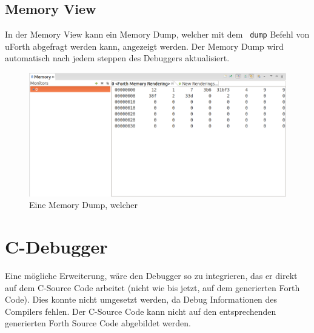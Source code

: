 \subsection{Memory View}

In der Memory View kann ein Memory Dump, welcher mit dem \verb! dump! Befehl von uForth abgefragt werden kann, angezeigt werden. Der Memory Dump wird automatisch nach jedem steppen des Debuggers aktualisiert.

\begin{figure}[H]
	\centering
		\includegraphics[scale=0.35]{debugger/dump.png}
		\caption{Eine Memory Dump, welcher}
		\label{fig:extensionpoint}
\end{figure}


\section{C-Debugger}

Eine mögliche Erweiterung, wäre den Debugger so zu integrieren, das er direkt auf dem C-Source Code arbeitet (nicht wie bis jetzt, auf dem generierten Forth Code). Dies konnte nicht umgesetzt werden, da Debug Informationen des Compilers fehlen. Der C-Source Code kann nicht auf den entsprechenden generierten Forth Source Code abgebildet werden.